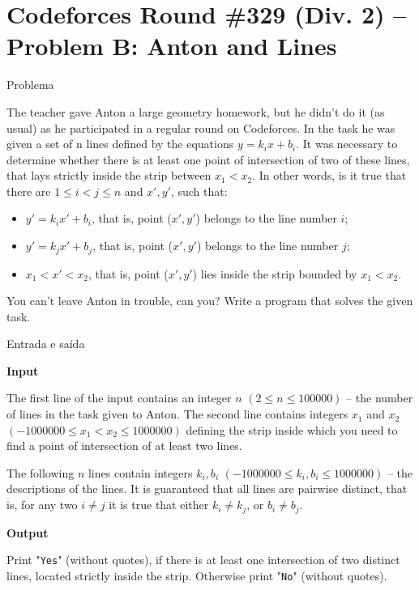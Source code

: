 \section{Codeforces Round \#329 (Div. 2) -- Problem B: Anton and Lines}

\begin{frame}[fragile]{Problema}


The teacher gave Anton a large geometry homework, but he didn't do it (as usual) as he 
participated in a regular round on Codeforces. In the task he was given a set of n lines defined 
by the equations $y = k_ix + b_i$. It was necessary to determine whether there is at least one 
point of intersection of two of these lines, that lays strictly inside the strip between 
$x_1 < x_2$. In other words, is it true that there are $1\leq i < j\leq n$ and $x', y'$, such that:

\begin{itemize}
    \item $y' = k_ix' + b_i$, that is, point ($x', y'$) belongs to the line number $i$;
    \item $y' = k_jx' + b_j$, that is, point ($x', y'$) belongs to the line number $j$;
    \item $x_1 < x' < x_2$, that is, point ($x', y'$) lies inside the strip bounded by $x_1 < x_2$.
\end{itemize}

You can't leave Anton in trouble, can you? Write a program that solves the given task.

\end{frame}

\begin{frame}[fragile]{Entrada e saída}

\textbf{Input}

The first line of the input contains an integer $n$ $(2\leq n\leq 100 000)$ --  the number of lines 
in the task given to Anton. The second line contains integers $x_1$ and $x_2$ 
$(-1 000 000\leq x_1 < x_2\leq 1 000 000)$ defining the strip inside which you need to find a point 
of intersection of at least two lines.

The following $n$ lines contain integers $k_i, b_i$ $(-1 000 000\leq k_i, b_i\leq 1 000 000)$ -- the 
descriptions of the lines. It is guaranteed that all lines are pairwise distinct, that is, for any 
two $i\neq j$ it is true that either $k_i\neq k_j$, or $b_i\neq b_j$.

\textbf{Output}

Print "\texttt{Yes}" (without quotes), if there is at least one intersection of two distinct lines, located strictly inside the strip. Otherwise print "\texttt{No}" (without quotes).

\end{frame}

